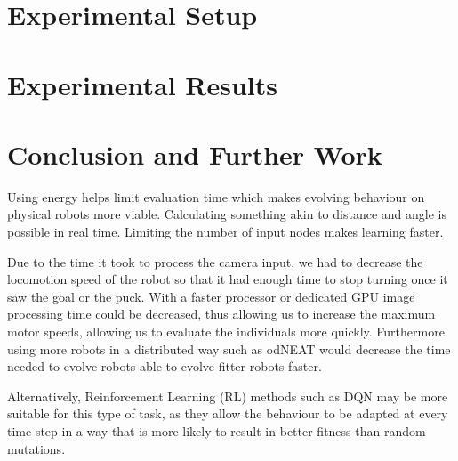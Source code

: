 \documentclass{article}
\begin{document}

	\section{Experimental Setup} %
	\label{sec:setup}


	\section{Experimental Results} %
	\label{sec:results}
	

	\section{Conclusion and Further Work} %
	\label{sec:conclusion}
	Using energy helps limit evaluation time which makes evolving behaviour on
	physical robots more viable.
	Calculating something akin to distance and angle is possible in real time.
	Limiting the number of input nodes makes learning faster. %

	Due to the time it took to process the camera input, we had to decrease the
	locomotion speed of the robot so that it had enough time to stop turning
	once it saw the goal or the puck. With a faster processor or dedicated GPU
	image processing time could be decreased, thus allowing us to increase the
	maximum motor speeds, allowing us to evaluate the individuals more quickly.
	Furthermore using more robots in a distributed way such as odNEAT
	\cite{silva2012odneat} would decrease the time needed to evolve robots able
	to evolve fitter robots faster.

	Alternatively, Reinforcement Learning (RL) methods such as DQN
	\cite{mnih2013playing} may be more suitable for this type of task, as they
	allow the behaviour to be adapted at every time-step in a way that is more
	likely to result in better fitness than random mutations.



\end{document}

